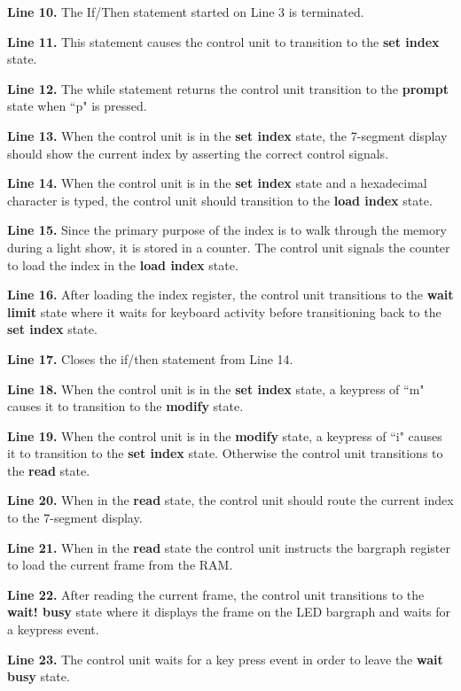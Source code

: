 \textbf{ Line 10.} The If/Then statement started on Line 3 is terminated.

\textbf{ Line 11.} This statement causes the control unit to transition to the \textbf{ set index}
 state.

\textbf{ Line 12.} The while statement returns the control unit transition to the \textbf{ prompt} state when 
``p" is pressed.

\textbf{ Line 13.} When the control unit is in the \textbf{ set index} state, the 7-segment display 
should show the current index by asserting the correct control signals.

\textbf{ Line 14.} When the control unit is in the \textbf{ set index} state and a hexadecimal 
character is typed, the control unit should transition to the \textbf{ load index} state.

\textbf{ Line 15.} Since the primary purpose of the index is to walk through the memory 
during a light show, it is stored in a counter.  The control unit signals the 
counter to load the index in the \textbf{ load index} state.

\textbf{ Line 16.} After loading the index register, the control unit transitions to the \textbf{ wait 
limit} state where it waits for keyboard activity before transitioning back 
to the \textbf{ set index} state.

\textbf{ Line 17.} Closes the if/then statement from Line 14.

\textbf{ Line 18.} When the control unit is in the \textbf{ set index} state, a keypress of ``m" 
causes it to transition to the \textbf{ modify} state.

\textbf{ Line 19.} When the control unit is in the \textbf{ modify} state, a keypress of ``i" 
causes it to transition to the \textbf{ set index} state.  Otherwise the control 
unit transitions to the \textbf{ read} state.  

\textbf{ Line 20.} When in the \textbf{ read} state, the control unit should route the current 
index to the 7-segment display.

\textbf{ Line 21.} When in the \textbf{ read} state the control unit instructs the bargraph register 
to load the current frame from the RAM.


\textbf{ Line 22.} After reading the current frame, the control unit transitions 
to the \textbf{ wait! busy} state where it displays the frame on the LED bargraph 
and waits for a keypress event.

\textbf{ Line 23.} The control unit waits for a key press event in order 
to leave the \textbf{ wait busy} state.

